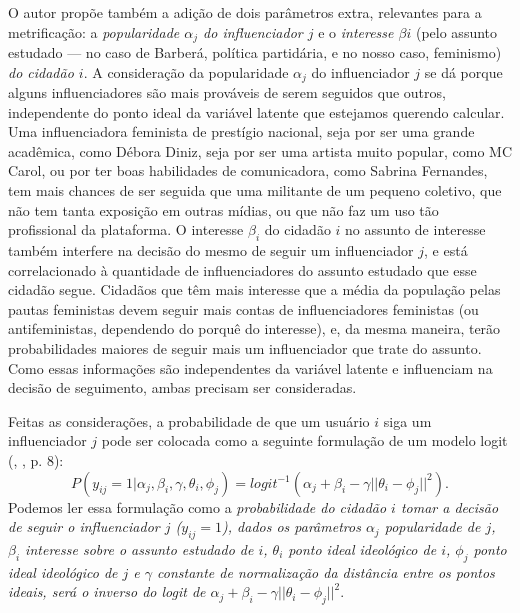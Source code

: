 \documentclass[
	12pt,				%
	openright,			%
	twoside,			%
	a4paper,			%
	english,			%
	brazil				%
	]{abntex2}
\begin{document}
 O autor propõe também a adição de dois parâmetros extra, relevantes para a metrificação: a \emph{popularidade $\alpha_{j}$ do influenciador $j$} e o \emph{interesse $\beta{i}$} (pelo assunto estudado --- no caso de Barberá, política partidária, e no nosso caso, feminismo) \emph{do cidadão $i$}. A consideração da popularidade $\alpha_{j}$ do influenciador $j$ se dá porque alguns influenciadores são mais prováveis de serem seguidos que outros, independente do ponto ideal da variável latente que estejamos querendo calcular. Uma influenciadora feminista de prestígio nacional, seja por ser uma grande acadêmica, como Débora Diniz, seja por ser uma artista muito popular, como MC Carol, ou por ter boas habilidades de comunicadora, como Sabrina Fernandes, tem mais chances de ser seguida que uma militante de um pequeno coletivo, que não tem tanta exposição em outras mídias, ou que não faz um uso tão profissional da plataforma. O interesse $\beta_{i}$ do cidadão $i$ no assunto de interesse também interfere na decisão do mesmo de seguir um influenciador $j$, e está correlacionado à quantidade de influenciadores do assunto estudado que esse cidadão segue. Cidadãos que têm mais interesse que a média da população pelas pautas feministas devem seguir mais contas de influenciadores feministas (ou antifeministas, dependendo do porquê do interesse), e, da mesma maneira, terão probabilidades maiores de seguir mais um influenciador que trate do assunto. Como essas informações são independentes da variável latente e influenciam na decisão de seguimento, ambas precisam ser consideradas.
 
 Feitas as considerações, a probabilidade de que um usuário $i$ siga um influenciador $j$ pode ser colocada como a seguinte formulação de um modelo logit (, \citeyear{barbera2015}, p. 8):
 \begin{equation}
     P(y_{ij} = 1| \alpha_{j}, \beta_{i}, \gamma, \theta_{i}, \phi_{j}) = logit^{-1}(\alpha_{j} + \beta_{i} - \gamma ||\theta_{i} - \phi_{j}||^{2}).\label{probseguimento}
 \end{equation}
 Podemos ler essa formulação como a \emph{probabilidade do cidadão $i$ tomar a decisão de seguir o influenciador $j$ ($y_{ij} = 1$), dados os parâmetros $\alpha_{j}$ popularidade de $j$, $\beta_{i}$ interesse sobre o assunto estudado de $i$, $\theta_{i}$ ponto ideal ideológico de $i$, $\phi_{j}$ ponto ideal ideológico de $j$ e $\gamma$ constante de normalização da distância entre os pontos ideais, será o inverso do logit de $\alpha_{j} + \beta_{i} - \gamma ||\theta_{i} - \phi_{j}||^{2}$}. 
 
\end{document}
